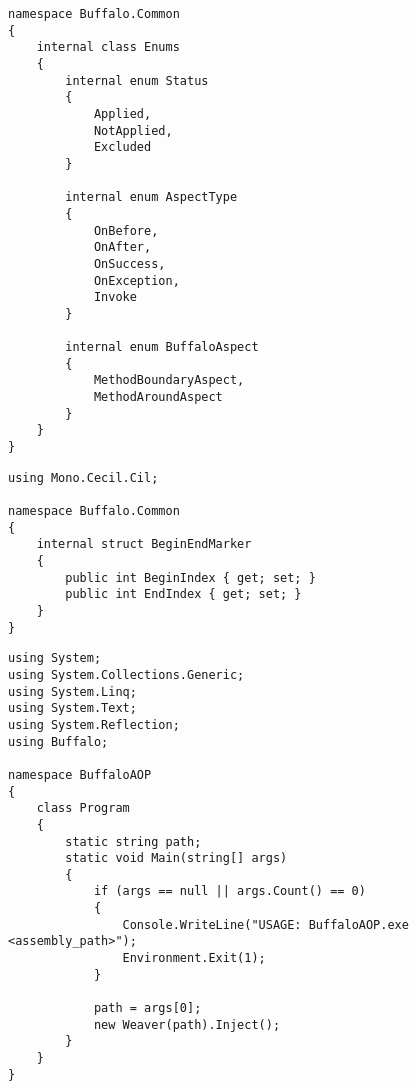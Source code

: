 \begin{lstlisting}[caption={../buffalo/Common/Enums.cs}, label=../buffalo/Common/Enums.cs, frame=tb, basicstyle=\scriptsize]﻿namespace Buffalo.Common
{
    internal class Enums
    {
        internal enum Status
        {
            Applied,
            NotApplied,
            Excluded
        }

        internal enum AspectType
        {
            OnBefore,
            OnAfter,
            OnSuccess,
            OnException,
            Invoke
        }

        internal enum BuffaloAspect
        {
            MethodBoundaryAspect,
            MethodAroundAspect
        }
    }
}
\end{lstlisting}

\begin{lstlisting}[caption={../buffalo/Common/BeginEndMarker.cs}, label=../buffalo/Common/BeginEndMarker.cs, frame=tb, basicstyle=\scriptsize]﻿using Mono.Cecil.Cil;

namespace Buffalo.Common
{
    internal struct BeginEndMarker
    {
        public int BeginIndex { get; set; }
        public int EndIndex { get; set; }
    }
}
\end{lstlisting}

\begin{lstlisting}[caption={../../buffalo/BuffaloAOP/Program.cs}, label=../../buffalo/BuffaloAOP/Program.cs, frame=tb, basicstyle=\scriptsize]﻿using System;
using System.Collections.Generic;
using System.Linq;
using System.Text;
using System.Reflection;
using Buffalo;

namespace BuffaloAOP
{
    class Program
    {
        static string path;
        static void Main(string[] args)
        {
            if (args == null || args.Count() == 0)
            {
                Console.WriteLine("USAGE: BuffaloAOP.exe <assembly_path>");
                Environment.Exit(1);
            }

            path = args[0];
            new Weaver(path).Inject();
        }
    }
}
\end{lstlisting}

